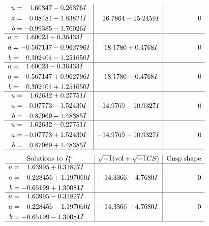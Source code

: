 \documentclass[1p]{elsarticle_modified}
\theoremstyle{definition}
\newcommand{\I}{\sqrt{-1}}
\begin{document}
$$\begin{array}{c|c|c}
\begin{aligned}
u &= \phantom{-}1.60347 - 0.26376 I \\
a &= \phantom{-}0.08484 - 1.83824 I \\
b &= -0.99385 - 1.70026 I\end{aligned}
 & \phantom{-}16.7864 + 15.2459 I & \phantom{-0.000000 } 0 \\ \hline\begin{aligned}
u &= \phantom{-}1.60023 + 0.36433 I \\
a &= -0.567147 - 0.962796 I \\
b &= \phantom{-}0.302404 - 1.251650 I\end{aligned}
 & \phantom{-}18.1780 + 0.4768 I & \phantom{-0.000000 } 0 \\ \hline\begin{aligned}
u &= \phantom{-}1.60023 - 0.36433 I \\
a &= -0.567147 + 0.962796 I \\
b &= \phantom{-}0.302404 + 1.251650 I\end{aligned}
 & \phantom{-}18.1780 - 0.4768 I & \phantom{-0.000000 } 0 \\ \hline\begin{aligned}
u &= \phantom{-}1.62632 + 0.27751 I \\
a &= -0.07773 - 1.52430 I \\
b &= \phantom{-}0.87969 - 1.48385 I\end{aligned}
 & -14.9769 - 10.9327 I & \phantom{-0.000000 } 0 \\ \hline\begin{aligned}
u &= \phantom{-}1.62632 - 0.27751 I \\
a &= -0.07773 + 1.52430 I \\
b &= \phantom{-}0.87969 + 1.48385 I\end{aligned}
 & -14.9769 + 10.9327 I & \phantom{-0.000000 } 0\\
 \hline 
 \end{array}$$\newpage$$\begin{array}{c|c|c}  
\text{Solutions to }I^u_{1}& \I (\text{vol} + \sqrt{-1}CS) & \text{Cusp shape}\\
 \hline 
\begin{aligned}
u &= \phantom{-}1.63995 + 0.31827 I \\
a &= \phantom{-}0.228456 + 1.197060 I \\
b &= -0.65199 + 1.30081 I\end{aligned}
 & -14.3366 - 4.7680 I & \phantom{-0.000000 } 0 \\ \hline\begin{aligned}
u &= \phantom{-}1.63995 - 0.31827 I \\
a &= \phantom{-}0.228456 - 1.197060 I \\
b &= -0.65199 - 1.30081 I\end{aligned}
 & -14.3366 + 4.7680 I & \phantom{-0.000000 } 0\\
 \hline 
 \end{array}$$\newpage\newpage\renewcommand{\arraystretch}{1}
\end{document}
